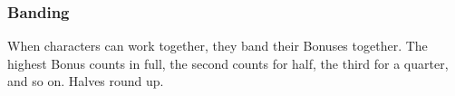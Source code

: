 \subsubsection{Banding}

When characters can work together, they band their Bonuses together.
The highest Bonus counts in full, the second counts for half, the third for a quarter, and so on.
Halves round up.
